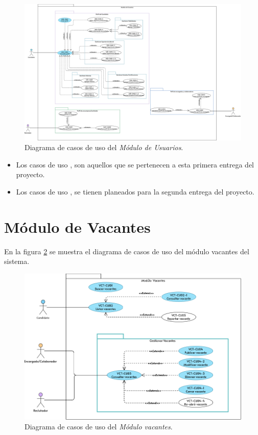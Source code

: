 	\begin{figure}[hbtp!]
		\begin{center}
			\includegraphics[width=1 \textwidth]{anexos/imagenes/CUUSR.png}
		\end{center}
		
		\caption{Diagrama de casos de uso del \textit{Módulo de Usuarios}.}
		\label{adcu:usr}
	\end{figure}

	\begin{itemize}
        \item Los casos de uso \IUazul{} , son aquellos que se pertenecen a esta primera entrega del proyecto.
        \item Los casos de uso \IUblanco{}, se tienen planeados para la segunda entrega del proyecto.
    \end{itemize} 

	
	

\section{Módulo de Vacantes}
	En la figura \ref{adcu:usr} se muestra el diagrama de casos de uso del módulo vacantes del sistema.

	\begin{figure}[hbtp!]
		\begin{center}
			\includegraphics[width=.8\textwidth]{sprints/imagenes/MUVCT.png}
		\end{center}
		
		\caption{Diagrama de casos de uso del \textit{Módulo vacantes}.}
		\label{adcu:usr}
	\end{figure}

